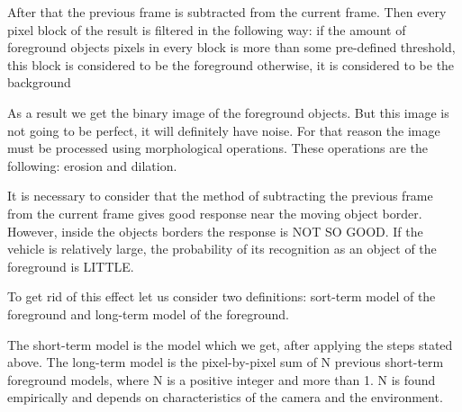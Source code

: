 \documentclass[12pt,a4paper,oneside,titlepage]{article}
\begin{document}
After that the previous frame is subtracted from the current frame.
Then every pixel block of the result is filtered in the following way:
if the amount of foreground objects pixels in every block is more than some pre-defined threshold, this block is considered to be the foreground
otherwise, it is considered to be the background

As a result we get the binary image of the foreground objects.
But this image is not going to be perfect, it will definitely have noise.
For that reason the image must be processed using morphological operations.
These operations are the following: erosion and dilation.

It is necessary to consider that the method of subtracting the previous frame from the current frame gives good response near the moving object border. 
However, inside the objects borders the response is NOT SO GOOD.
If the vehicle is relatively large, the probability of its recognition as an object of the foreground is LITTLE.

To get rid of this effect let us consider two definitions: sort-term model of the foreground and long-term model of the foreground.

The short-term model is the model which we get, after applying the steps stated above.
The long-term model is the pixel-by-pixel sum of N previous short-term foreground models, where N is a positive integer and more than 1.  
N is found empirically and depends on characteristics of the camera and the environment.
\end{document}
